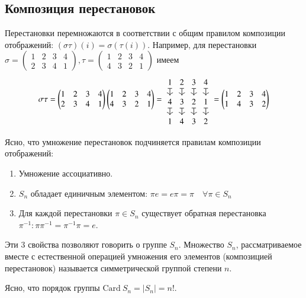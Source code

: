 \documentclass{article}
\begin{document}
\subsection{Композиция перестановок}
Перестановки перемножаются в соответствии с общим правилом композиции отображений: $(\sigma\tau)(i) = \sigma(\tau(i))$. Например, для перестановки $\sigma = \left(\begin{matrix}1 & 2 & 3 & 4 \\ 2 & 3 & 4 & 1\end{matrix}\right), \tau = \left(\begin{matrix}1 & 2 & 3 & 4 \\ 4 & 3 & 2 & 1\end{matrix}\right)$ имеем \[
\sigma\tau = \left(\begin{matrix}1 & 2 & 3 & 4 \\ 2 & 3 & 4 & 1\end{matrix}\right)\left(\begin{matrix}1 & 2 & 3 & 4 \\ 4 & 3 & 2 & 1\end{matrix}\right) = \begin{tikzcd}[column sep=0.5, row sep=small]
1 \dar[mapsto]	& 2 \dar[mapsto]	& 3 \dar[mapsto]	& 4 \dar[mapsto] \\
4 \dar[mapsto]	& 3 \dar[mapsto]	& 2 \dar[mapsto]	& 1 \dar[mapsto] \\
1				& 4 				& 3 				& 2
\end{tikzcd} = \left(\begin{matrix}1 & 2 & 3 & 4 \\ 1 & 4 & 3 & 2\end{matrix}\right)
\]

Ясно, что умножение перестановок подчиняется правилам композиции отображений:
\begin{enumerate}
\item Умножение ассоциативно.
\item $S_n$ обладает единичным элементом: $\pi e = e\pi = \pi \quad \forall \pi \in S_n$
\item Для каждой перестановки $\pi \in S_n$ существует обратная перестановка $\pi^{-1}: \pi \pi^{-1} = \pi^{-1}\pi = e$.
\end{enumerate}
Эти 3 свойства позволяют говорить о группе $S_n$. Множество $S_n$, рассматриваемое вместе с естественной операцией умножения его элементов (композицией перестановок) называется симметрической группой степени $n$.

Ясно, что порядок группы $\mathrm{Card}~S_n = |S_n| = n!$.
\end{document}
